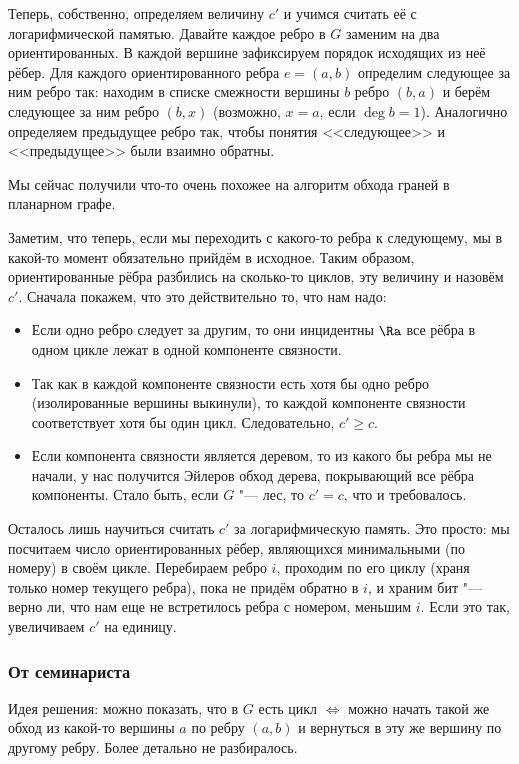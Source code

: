 		Теперь, собственно, определяем величину $c'$ и учимся считать её с логарифмической памятью.
		Давайте каждое ребро в $G$ заменим на два ориентированных.
		В каждой вершине зафиксируем порядок исходящих из неё рёбер.
		Для каждого ориентированного ребра $e=(a, b)$ определим следующее за ним ребро так:
		находим в списке смежности вершины $b$ ребро $(b, a)$ и берём следующее за ним ребро $(b, x)$
		(возможно, $x=a$, если $\deg b = 1$).
		Аналогично определяем предыдущее ребро так, чтобы понятия <<следующее>> и <<предыдущее>>
		были взаимно обратны.
		\begin{Rem}
			Мы сейчас получили что-то очень похожее на алгоритм обхода граней в планарном графе.
		\end{Rem}
		Заметим, что теперь, если мы переходить с какого-то ребра к следующему, мы в какой-то
		момент обязательно прийдём в исходное.
		Таким образом, ориентированные рёбра разбились на сколько-то циклов, эту величину и назовём $c'$.
		Сначала покажем, что это действительно то, что нам надо:
		\begin{itemize}
			\item
				Если одно ребро следует за другим, то они инцидентны $\Ra$
				все рёбра в одном цикле лежат в одной компоненте связности.
			\item
				Так как в каждой компоненте связности есть хотя бы одно ребро (изолированные
				вершины выкинули), то каждой компоненте связности соответствует хотя бы один цикл.
				Следовательно, $c' \ge c$.
			\item
				Если компонента связности является деревом, то из какого бы ребра мы не начали,
				у нас получится Эйлеров обход дерева, покрывающий все рёбра компоненты.
				Стало быть, если $G$ "--- лес, то $c' = c$, что и требовалось.
		\end{itemize}

		Осталось лишь научиться считать $c'$ за логарифмическую память.
		Это просто: мы посчитаем число ориентированных рёбер, являющихся минимальными (по номеру) в своём цикле.
		Перебираем ребро $i$, проходим по его циклу (храня только номер текущего ребра), пока не придём обратно в $i$,
		и храним бит "--- верно ли, что нам еще не встретилось ребра с номером, меньшим $i$.
		Если это так, увеличиваем $c'$ на единицу.

	\subsubsection{От семинариста}
		Идея решения: можно показать, что в $G$ есть цикл $\iff$
		можно начать такой же обход из какой-то вершины $a$ по ребру $(a,b)$ и вернуться в эту же вершину по другому ребру.
		Более детально не разбиралось.

